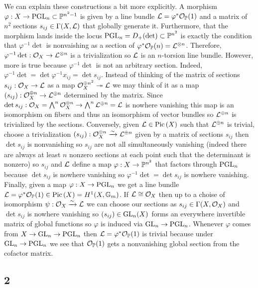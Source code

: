 \documentclass[12pt]{article}
\begin{document}
We can explain these constructions a bit more explicitly. A morphism $\varphi : X \to \PGL_n \subset \P^{n^2 - 1}$ is given by a line bundle $\L = \varphi^* \struct{\P}(1)$ and a matrix of $n^2$ sections $s_{ij} \in \Gamma(X, \L)$ that globally generate it. Furthermore, that the morphism lands inside the locus $\PGL_n = D_+(\det) \subset \P^{n^2}$ is exactly the condition that $\varphi^{-1} \det$ is nonvaishing as a section of $\varphi^* \struct{\P}(n) = \L^{\otimes n}$. Therefore, $\varphi^{-1} \det : \struct{X} \to \L^{\otimes n}$ is a trivialization so $\L$ is an $n$-torsion line bundle. However, more is true because $\varphi^{-1} \det$ is not an arbitrary section. Indeed, $\varphi^{-1} \det = \det{\varphi^{-1} x_{ij}} = \det{s_{ij}}$. Instead of thinking of the matrix of sections $s_{ij} : \struct{X} \to \L$ as a map $\struct{X}^{\oplus n^2} \onto \L$ we may think of it as a map $(s_{ij}) : \struct{X}^{\oplus n} \to \L^{\oplus n}$ determined by the matrix. Since $\det{s_{ij}} : \struct{X} = \bigwedge^n \struct{X}^{\oplus n} \to \bigwedge^n \L^{\oplus n} = \L$ is nowhere vanishing this map is an isomorphism on fibers and thus an isomorphism of vector bundles so $\L^{\oplus n}$ is trivialized by the sections. Conversely, given $\L \in \Pic{X}$ such that $\L^{\oplus n}$ is trivial, choose a trivialization $(s_{ij}) : \struct{X}^{\oplus n} \iso \L^{\oplus n}$ given by a matrix of sections $s_{ij}$ then $\det{s_{ij}}$ is nonvanishing so $s_{ij}$ are not all simultaneously vanishing (indeed there are always at least $n$ nonzero sections at each point such that the determinant is nonzero) so $s_{ij}$ and $\L$ define a map $\varphi : X \to \P^{n^2}$ that factors through $\PGL_n$ because $\det{s_{ij}}$ is nowhere vanishing so $\varphi^{-1} \det = \det{s_{ij}}$ is nowhere vanishing. Finally, given a map $\varphi : X \to \PGL_n$ we get a line bundle $\L = \varphi^* \struct{\P}(1) \in \Pic{X} = H^1(X, \Gm)$. If $\L \cong \struct{X}$ then up to a choise of isomorphism $\psi : \struct{X} \iso \L$ we can choose our sections as $s_{ij} \in \Gamma(X, \struct{X})$ and $\det{s_{ij}}$ is nowhere vanishing so $(s_{ij}) \in \GL_n(X)$ forms an everywhere invertible matrix of global functions so $\varphi$ is induced via $\GL_n \to \PGL_n$. Whenever $\varphi$ comes from $X \to \GL_n \to \PGL_n$ then $\L = \varphi^* \struct{\P}(1)$ is trivial because under $\GL_n \to \PGL_n$ we see that $\struct{\P}(1)$ gets a nonvanishing global section from the cofactor matrix.

\subsection{2}
\end{document}
